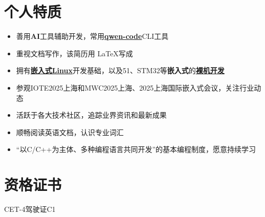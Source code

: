 \documentclass[11pt,a4paper]{ctexart}
\begin{document}
\section*{个人特质}
\vspace{-0.1em}
\begin{itemize}
    \item 善用\textbf{AI}工具辅助开发，常用\underline{\textbf{qwen-code}}CLI工具
    \item 重视文档写作，该简历用 \LaTeX 写成
    \item 拥有\underline{\textbf{嵌入式Linux}}开发基础，以及51、STM32等\textbf{嵌入式}的\underline{\textbf{裸机开发}}
    \item 参观IOTE2025上海和MWC2025上海、2025上海国际嵌入式会议，关注行业动态
    \item 活跃于各大技术社区，追踪业界资讯和最新成果
    \item 顺畅阅读英语文档，认识专业词汇
    \item “以C/C++为主体、多种编程语言共同开发”的基本编程制度，愿意持续学习
\end{itemize}

\section*{资格证书}
\vspace{-0.1em}
\par\noindent
CET-4\hspace{1cm}驾驶证C1
\end{document}
